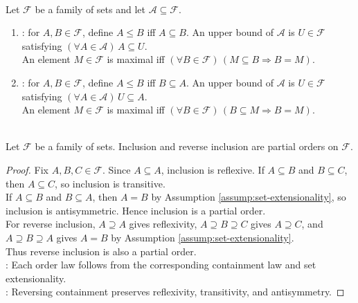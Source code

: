 \begin{definition} \label{def:inclusion-and-containment-orders-for-zorn} \\
Let $\mathcal{F}$ be a family of sets and let $\mathcal{A}\subseteq\mathcal{F}$.
\begin{enumerate}[label=(\roman*)]
\setlength{\itemsep}{0pt}
\item {}: for $A,B\in\mathcal{F}$, define $A\leq B$ iff $A\subseteq B$. An upper bound of $\mathcal{A}$ is $U\in\mathcal{F}$ satisfying $(\forall A\in\mathcal{A})\,A\subseteq U$.\\
An element $M\in\mathcal{F}$ is maximal iff $(\forall B\in\mathcal{F})\,(M\subseteq B\Rightarrow B=M)$.
\item {}: for $A,B\in\mathcal{F}$, define $A\leq B$ iff $B\subseteq A$. An upper bound of $\mathcal{A}$ is $U\in\mathcal{F}$ satisfying $(\forall A\in\mathcal{A})\,U\subseteq A$.\\
An element $M\in\mathcal{F}$ is maximal iff $(\forall B\in\mathcal{F})\,(B\subseteq M\Rightarrow B=M)$.
\end{enumerate}
\end{definition}

\begin{proposition} \label{prop:inclusion-and-reverse-inclusion-partial-orders} \\
Let $\mathcal{F}$ be a family of sets. Inclusion and reverse inclusion are partial orders on $\mathcal{F}$.
\begin{proof}
Fix $A,B,C\in\mathcal{F}$. Since $A\subseteq A$, inclusion is reflexive. If $A\subseteq B$ and $B\subseteq C$, then $A\subseteq C$, so inclusion is transitive.\\
If $A\subseteq B$ and $B\subseteq A$, then $A=B$ by Assumption \ref{assump:set-extensionality}, so inclusion is antisymmetric. Hence inclusion is a partial order.\\
For reverse inclusion, $A\supseteq A$ gives reflexivity, $A\supseteq B\supseteq C$ gives $A\supseteq C$, and $A\supseteq B\supseteq A$ gives $A=B$ by Assumption \ref{assump:set-extensionality}.\\
Thus reverse inclusion is also a partial order.\\
: Each order law follows from the corresponding containment law and set extensionality.\\
: Reversing containment preserves reflexivity, transitivity, and antisymmetry.
\end{proof}
\end{proposition}

